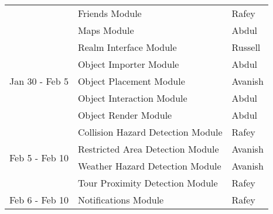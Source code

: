 \documentclass[12pt, titlepage]{article}
\begin{document}
\begin{table}[H]
\begin{tabular}{lll}
\multicolumn{1}{|l|}{}                                 & \multicolumn{1}{l|}{Friends Module}                           & \multicolumn{1}{l|}{Rafey}                    \\ \cline{2-3} 
\multicolumn{1}{|l|}{}                                 & \multicolumn{1}{l|}{Maps Module}                              & \multicolumn{1}{l|}{Abdul}                    \\ \hline
\multicolumn{1}{|l|}{\multirow{5}{*}{Jan 30 - Feb 5}}  & \multicolumn{1}{l|}{Realm Interface Module}                   & \multicolumn{1}{l|}{Russell}                  \\ \cline{2-3} 
\multicolumn{1}{|l|}{}                                 & \multicolumn{1}{l|}{Object Importer Module}                   & \multicolumn{1}{l|}{Abdul}                    \\ \cline{2-3} 
\multicolumn{1}{|l|}{}                                 & \multicolumn{1}{l|}{Object Placement Module}                  & \multicolumn{1}{l|}{Avanish}                  \\ \cline{2-3} 
\multicolumn{1}{|l|}{}                                 & \multicolumn{1}{l|}{Object Interaction Module}                & \multicolumn{1}{l|}{Abdul}                    \\ \cline{2-3} 
\multicolumn{1}{|l|}{}                                 & \multicolumn{1}{l|}{Object Render Module}                     & \multicolumn{1}{l|}{Abdul}                    \\ \hline
\multicolumn{1}{|l|}{\multirow{4}{*}{Feb 5 - Feb 10}}  & \multicolumn{1}{l|}{Collision Hazard Detection Module}         & \multicolumn{1}{l|}{Rafey}                    \\ \cline{2-3} 
\multicolumn{1}{|l|}{}                                 & \multicolumn{1}{l|}{Restricted Area Detection Module}          & \multicolumn{1}{l|}{Avanish}                  \\ \cline{2-3} 
\multicolumn{1}{|l|}{}                                 & \multicolumn{1}{l|}{Weather Hazard Detection Module}           & \multicolumn{1}{l|}{Avanish}                  \\ \cline{2-3} 
\multicolumn{1}{|l|}{}                                 & \multicolumn{1}{l|}{Tour Proximity Detection Module}           & \multicolumn{1}{l|}{Rafey}                    \\ \hline
\multicolumn{1}{|l|}{\multirow{4}{*}{Feb 6 - Feb 10}}  & \multicolumn{1}{l|}{Notifications Module}                     & \multicolumn{1}{l|}{Rafey}                    \\ \cline{2-3} 

\end{tabular}
\end{table}
\end{document}
